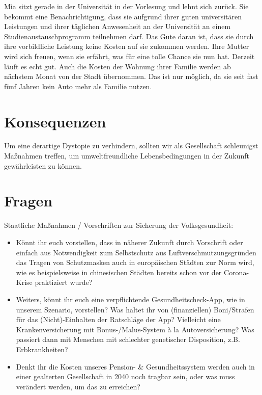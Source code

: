 \documentclass[twoside, a4paper, DIV=11, open=any, bibliography=totoc]{scrbook}
\begin{document}
Mia sitzt gerade in der Universität in der Vorlesung und lehnt sich zurück. 
Sie bekommt eine Benachrichtigung, dass sie aufgrund ihrer guten universitären 
Leistungen und ihrer täglichen Anwesenheit an der Universität an einem 
Studienaustauschprogramm teilnehmen darf. Das Gute daran ist, 
dass sie durch ihre vorbildliche Leistung keine Kosten auf sie zukommen werden. 
Ihre Mutter wird sich freuen, wenn sie erfährt, was für eine tolle Chance sie nun hat. 
Derzeit läuft es echt gut. Auch die Kosten der Wohnung ihrer Familie werden 
ab nächstem Monat von der Stadt übernommen. Das ist nur möglich, da sie seit fast 
fünf Jahren kein Auto mehr als Familie nutzen.

\section{Konsequenzen} \label{sec:szenkonsequenzen}

Um eine derartige Dystopie zu verhindern, sollten wir als Gesellschaft 
schleunigst Maßnahmen treffen,
um umweltfreundliche Lebensbedingungen in der Zukunft gewährleisten zu können.

\section{Fragen}

Staatliche Maßnahmen / Vorschriften zur Sicherung der Volksgesundheit:

\begin{itemize}
    \item Könnt ihr euch vorstellen, dass in näherer Zukunft durch Vorschrift
    oder einfach aus Notwendigkeit zum Selbstschutz aus Luftverschmutzungsgründen 
    das Tragen von Schutzmasken auch in europäischen Städten zur Norm wird,
    wie es beispielsweise in chinesischen Städten bereits schon vor der Corona-Krise praktiziert wurde?
    \item Weiters, könnt ihr euch eine verpflichtende Gesundheitscheck-App, wie in unserem Szenario, vorstellen?
    Was haltet ihr von (finanziellen) Boni/Strafen für das (Nicht)-Einhalten der Ratschläge der App?
    Vielleicht eine Krankenversicherung mit Bonus-/Malus-System à la Autoversicherung?
    Was passiert dann mit Menschen mit schlechter genetischer Disposition, z.B. Erbkrankheiten?
    \item Denkt ihr die Kosten unseres Pension- \& Gesundheitssystem werden auch in einer gealterten Gesellschaft in 2040
    noch tragbar sein, oder was muss verändert werden, um das zu erreichen?
\end{itemize}
\end{document}

